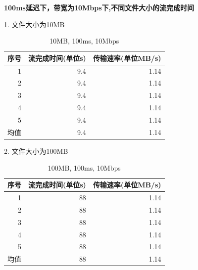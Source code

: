 \documentclass[11pt]{article}
\begin{document}
\newpage


\textbf{100ms延迟下，带宽为10Mbps下,不同文件大小的流完成时间}

1. 文件大小为10MB

\begin{table}[htbp]
  \centering
  \caption{10MB, 100ms, 10Mbps}
    \begin{tabular}{|l|r|r|}
    \hline
    序号    & \multicolumn{1}{l|}{流完成时间(单位s)} & \multicolumn{1}{l|}{传输速率(单位MB/s)} \bigstrut\\
    \hline
    \multicolumn{1}{|r|}{1} & 9.4   & 1.14 \bigstrut\\
    \hline
    \multicolumn{1}{|r|}{2} & 9.4   & 1.14 \bigstrut\\
    \hline
    \multicolumn{1}{|r|}{3} & 9.4   & 1.14 \bigstrut\\
    \hline
    \multicolumn{1}{|r|}{4} & 9.4   & 1.14 \bigstrut\\
    \hline
    \multicolumn{1}{|r|}{5} & 9.4   & 1.14 \bigstrut\\
    \hline
    均值    & 9.4   & 1.14 \bigstrut\\
    \hline
    \end{tabular}%
  
\end{table}%


2. 文件大小为100MB

\begin{table}[htbp]
  \centering
  \caption{100MB, 100ms, 10Mbps}
    \begin{tabular}{|l|r|r|}
    \hline
    序号    & \multicolumn{1}{l|}{流完成时间(单位s)} & \multicolumn{1}{l|}{传输速率(单位MB/s)} \bigstrut\\
    \hline
    \multicolumn{1}{|r|}{1} & 88    & 1.14 \bigstrut\\
    \hline
    \multicolumn{1}{|r|}{2} & 88    & 1.14 \bigstrut\\
    \hline
    \multicolumn{1}{|r|}{3} & 88    & 1.14 \bigstrut\\
    \hline
    \multicolumn{1}{|r|}{4} & 88    & 1.14 \bigstrut\\
    \hline
    \multicolumn{1}{|r|}{5} & 88    & 1.14 \bigstrut\\
    \hline
    均值    & 88    & 1.14 \bigstrut\\
    \hline
    \end{tabular}%
  
\end{table}%
\end{document}
